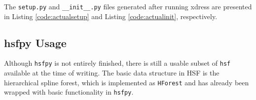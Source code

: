   The \texttt{setup.py} and \texttt{\_\_init\_\_.py} files generated after running xdress are presented in Listing \ref{code:actualsetup} and Listing \ref{code:actualinit}, respectively.

  \vspace{.2in}
  

  \vspace{.2in}
  
  \mainstretch{}



\subsection{hsfpy Usage} \label{sub:hsfpy_usage}

  Although \texttt{hsfpy} is not entirely finished, there is still a usable subset of \texttt{hsf} available at the time of writing. The basic data structure in HSF is the hierarchical spline forest, which is implemented as \texttt{HForest} and has already been wrapped with basic functionality in \texttt{hsfpy}.

